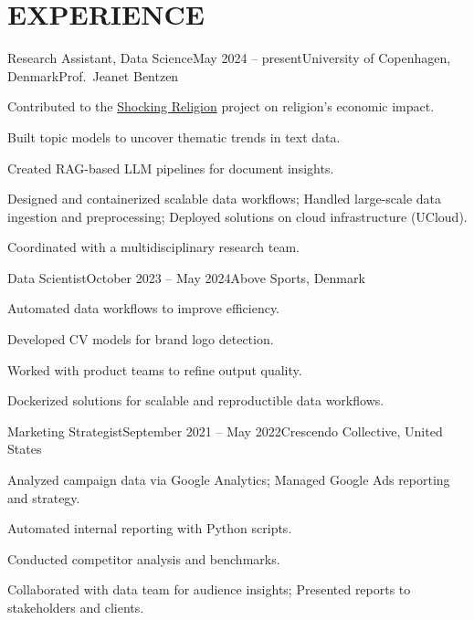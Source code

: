 \documentclass{resume}
\begin{document}
\section{EXPERIENCE}
\begin{content}

    \begin{position}{Research Assistant, Data Science}{May 2024 -- present}{University of Copenhagen, Denmark}{Prof.~Jeanet Bentzen}{}
        \item Contributed to the {\href{https://www.economics.ku.dk/research/externally-funded-research_new/shocking-religion/}{Shocking Religion}} project on religion's economic impact.
        \item Built topic models to uncover thematic trends in text data.
        \item Created RAG-based LLM pipelines for document insights.
        \item Designed and containerized scalable data workflows; Handled large-scale data ingestion and preprocessing; Deployed solutions on cloud infrastructure (UCloud).
        \item Coordinated with a multidisciplinary research team.
    \end{position}
    
    \begin{position}{Data Scientist}{October 2023 -- May 2024}{Above Sports, Denmark}{}{}
        \item Automated data workflows to improve efficiency.
        \item Developed CV models for brand logo detection.
        \item Worked with product teams to refine output quality.
        \item Dockerized solutions for scalable and reproductible data workflows.
    \end{position}
    
    \begin{position}{Marketing Strategist}{September 2021 -- May 2022}{Crescendo Collective, United States}{}{}
        \item Analyzed campaign data via Google Analytics; Managed Google Ads reporting and strategy.
        \item Automated internal reporting with Python scripts.
        \item Conducted competitor analysis and benchmarks.
        \item Collaborated with data team for audience insights; Presented reports to stakeholders and clients.
    \end{position}
    

\end{content}
\end{document}
